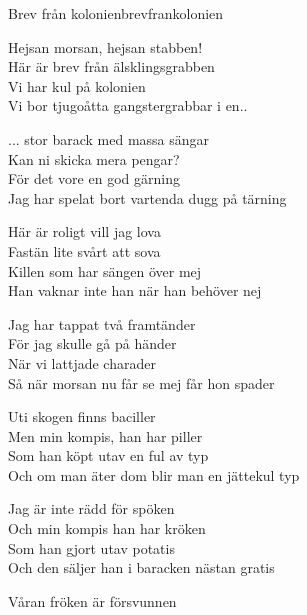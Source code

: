 \begin{song}{Brev från kolonien}{brevfrankolonien}
\begin{vers}
Hejsan morsan, hejsan stabben!\\
Här är brev från älsklingsgrabben\\
Vi har kul på kolonien\\
Vi bor tjugoåtta gangstergrabbar i en..\\
\end{vers}
\begin{vers}
... stor barack med massa sängar\\
Kan ni skicka mera pengar?\\
För det vore en god gärning\\
Jag har spelat bort vartenda dugg på tärning\\
\end{vers}
\begin{vers}
Här är roligt vill jag lova\\
Fastän lite svårt att sova\\
Killen som har sängen över mej\\
Han vaknar inte han när han behöver nej\\
\end{vers}
\begin{vers}
Jag har tappat två framtänder\\
För jag skulle gå på händer\\
När vi lattjade charader\\
Så när morsan nu får se mej får hon spader\\
\end{vers}
\begin{vers}
Uti skogen finns baciller\\
Men min kompis, han har piller\\
Som han köpt utav en ful av typ\\
Och om man äter dom blir man en jättekul typ\\
\end{vers}
\begin{vers}
Jag är inte rädd för spöken\\
Och min kompis han har kröken\\
Som han gjort utav potatis\\
Och den säljer han i baracken nästan gratis\\
\end{vers}
\begin{vers}
Våran fröken är försvunnen\\

\end{vers}
\end{song}
